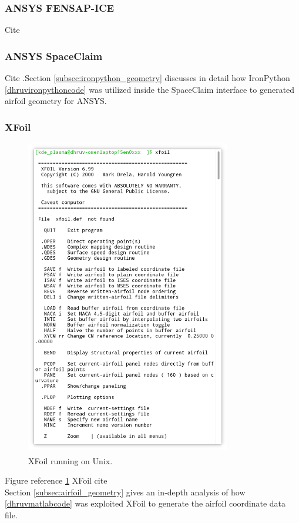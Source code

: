\documentclass[english]{kththesis}
\begin{document}
\subsubsection {ANSYS FENSAP-ICE}
Cite \cite{Habashi2004}
\subsubsection {ANSYS SpaceClaim}
Cite \cite{spaceclaim}.Section \ref{subsec:ironpython_geometry} discusses in detail how IronPython \ref{dhruvironpythoncode} was utilized inside the SpaceClaim interface to generated airfoil geometry for ANSYS.
\subsubsection {XFoil}
\begin{figure}[!htb]
    \centering
    \includegraphics[width=0.8\textwidth]{IPS/xfoil1.png}
    \caption{XFoil running on Unix\textsuperscript{\textregistered}.}
    \label{fig:xfoil1}
\end{figure}
Figure reference \ref{fig:xfoil1}
XFoil cite \cite{xfoil}\\Section \ref{subsec:airfoil_geometry} gives an in-depth analysis of how \ref{dhruvmatlabcode} was exploited XFoil to generate the airfoil coordinate data file.
\end{document}
